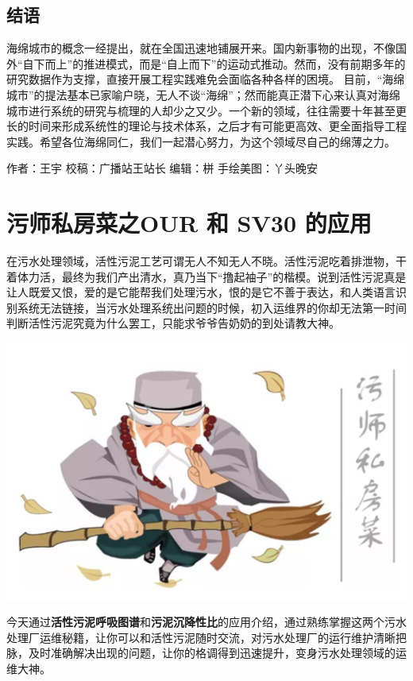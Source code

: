 \documentclass[]{book}
\begin{document}
\subsection{结语}\label{-1}

海绵城市的概念一经提出，就在全国迅速地铺展开来。国内新事物的出现，不像国外``自下而上''的推进模式，而是``自上而下''的运动式推动。然而，没有前期多年的研究数据作为支撑，直接开展工程实践难免会面临各种各样的困境。
目前，``海绵城市''的提法基本已家喻户晓，无人不谈``海绵''；然而能真正潜下心来认真对海绵城市进行系统的研究与梳理的人却少之又少。一个新的领域，往往需要十年甚至更长的时间来形成系统性的理论与技术体系，之后才有可能更高效、更全面指导工程实践。希望各位海绵同仁，我们一起潜心努力，为这个领域尽自己的绵薄之力。

作者：王宇 校稿：广播站王站长 编辑：栟 手绘美图：丫头晚安

\section{污师私房菜之OUR 和 SV30 的应用}\label{our--sv30-}

在污水处理领域，活性污泥工艺可谓无人不知无人不晓。活性污泥吃着排泄物，干着体力活，最终为我们产出清水，真乃当下``撸起袖子''的楷模。说到活性污泥真是让人既爱又恨，爱的是它能帮我们处理污水，恨的是它不善于表达，和人类语言识别系统无法链接，当污水处理系统出问题的时候，初入运维界的你却无法第一时间判断活性污泥究竟为什么罢工，只能求爷爷告奶奶的到处请教大神。

\includegraphics[width=6.67in]{images/os1}

今天通过\textbf{活性污泥呼吸图谱}和\textbf{污泥沉降性比}的应用介绍，通过熟练掌握这两个污水处理厂运维秘籍，让你可以和活性污泥随时交流，对污水处理厂的运行维护清晰把脉，及时准确解决出现的问题，让你的格调得到迅速提升，变身污水处理领域的运维大神。
\end{document}
